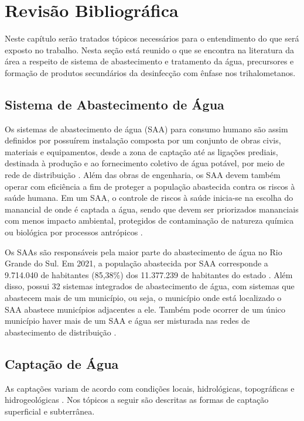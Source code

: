 \chapter{Revisão Bibliográfica} \label{Revisão Bibliográfica}
Neste capítulo serão tratados tópicos necessários para o entendimento do que será exposto no trabalho. Nesta seção está reunido o que se encontra na literatura da área a respeito de sistema de abastecimento e tratamento da água, precursores e formação de produtos secundários da desinfecção com ênfase nos trihalometanos.

\section{Sistema de Abastecimento de Água}
Os sistemas de abastecimento de água (SAA) para consumo humano são assim definidos por possuírem instalação composta por um conjunto de obras civis, materiais e equipamentos, desde a zona de captação até as ligações prediais, destinada à produção e ao fornecimento coletivo de água potável, por meio de rede de distribuição \cite{AnexoXX}. Além das obras de engenharia, os SAA devem também operar com eficiência a fim de proteger a população abastecida contra os riscos à saúde humana. Em um SAA, o controle de riscos à saúde inicia-se na escolha do manancial de onde é captada a água, sendo que devem ser priorizados mananciais com menos impacto ambiental, protegidos de contaminação de natureza química ou biológica por processos antrópicos \cite{brasila}.

Os SAAs são responsáveis pela maior parte do abastecimento de água no Rio Grande do Sul. Em 2021, a população abastecida por SAA corresponde a 9.714.040 de habitantes (85,38\%) dos 11.377.239 de habitantes do estado \cite{sisagua}. Além disso, possui 32 sistemas integrados de abastecimento de água, com sistemas que abastecem mais de um município, ou seja, o município onde está localizado o SAA abastece municípios adjacentes a ele. Também pode ocorrer de um único município haver mais de um SAA e água ser misturada nas redes de abastecimento de distribuição \cite{Brasil1}.

\section{Captação de Água}
As captações variam de acordo com condições locais, hidrológicas, topográficas e hidrogeológicas \cite{brasilb}. Nos tópicos a seguir são descritas as formas de captação superficial e subterrânea. 

